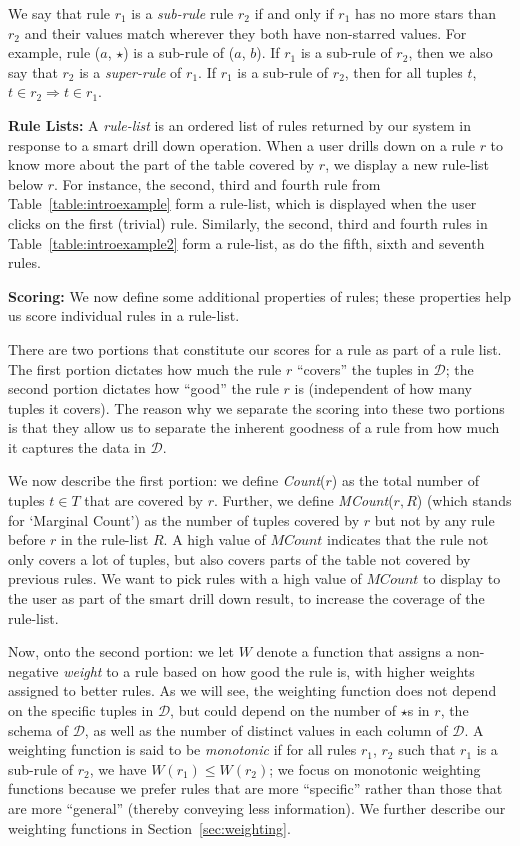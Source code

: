 \documentclass[10pt,journal,compsoc]{IEEEtran}
\newcommand{\stitle}[1]{\vspace{0.5em}\noindent\textbf{#1}}
\newcommand{\calD}{\mathcal{D}\xspace}
\begin{document}
We say that rule $r_1$ is a {\em sub-rule} rule $r_2$ if and only if $r_1$ has no more stars than $r_2$ and their values match wherever they both have non-starred values. For example, rule ($a$, $\star$) is a sub-rule of ($a$, $b$). If $r_1$ is a sub-rule of $r_2$, then we also say that $r_2$ is a {\em super-rule} of $r_1$. If $r_1$ is a sub-rule of $r_2$, then for all tuples $t$, $t \in r_2 \Rightarrow t \in r_1$. 

\stitle{Rule Lists:}
A {\em rule-list} is an ordered list of rules returned by our system in response to a smart drill down operation. 
When a user drills down on a rule $r$ to know more about the part of the table covered by $r$, we display a new rule-list below $r$.
For instance, the second, third and fourth rule from Table~\ref{table:introexample} form a rule-list, which is displayed when the user clicks on the first (trivial) rule. Similarly, the second, third and fourth rules in Table~\ref{table:introexample2} form a rule-list, as do the fifth, sixth and seventh rules. 

\stitle{Scoring:} We now define some additional properties of rules; these properties
help us score individual rules in a rule-list. 

There are two portions that constitute our scores for a rule as part of a rule list. 
The first portion dictates how much the rule $r$ ``covers'' the tuples in $\calD$;
the second portion dictates how ``good'' the rule $r$ is (independent of how many
tuples it covers). 
The reason why we separate the scoring into these two portions is
that they allow us to separate the inherent goodness of a rule from
how much it captures the data in $\calD$.

We now describe the first portion:
we define {\em Count}($r$) as the total number of tuples $t \in T$ that are covered by $r$. 
Further, we define {\em MCount}($r, R$) (which stands for `Marginal Count') as the number of tuples covered by $r$ but not by any rule before $r$ in the rule-list $R$. A high value of $MCount$ indicates that the rule not only covers a lot of tuples, but also covers parts of the table not covered by previous rules. We want to pick rules with a high value of $MCount$ to display to the user
as part of the smart drill down result, to increase the coverage of the rule-list. 

Now, onto the second portion: we let $W$ denote a function that assigns a non-negative {\em weight} to a rule based on how good the rule is, with higher weights assigned to better rules. 
As we will see, the weighting function does not depend on the specific
tuples in $\calD$, but could 
depend on the number of $\star$s in $r$,
the schema of $\calD$, 
as well as the number of distinct values in each column of $\calD$.
A weighting function is said to be {\em monotonic} if for all rules $r_1$, $r_2$ such that $r_1$ is a sub-rule of $r_2$, we have $W(r_1) \leq W(r_2)$; we focus
on monotonic weighting functions because we prefer 
rules that are more ``specific''
rather than those that are more ``general'' 
(thereby conveying less information).
We further describe our weighting functions in Section~\ref{sec:weighting}. 
\end{document}
